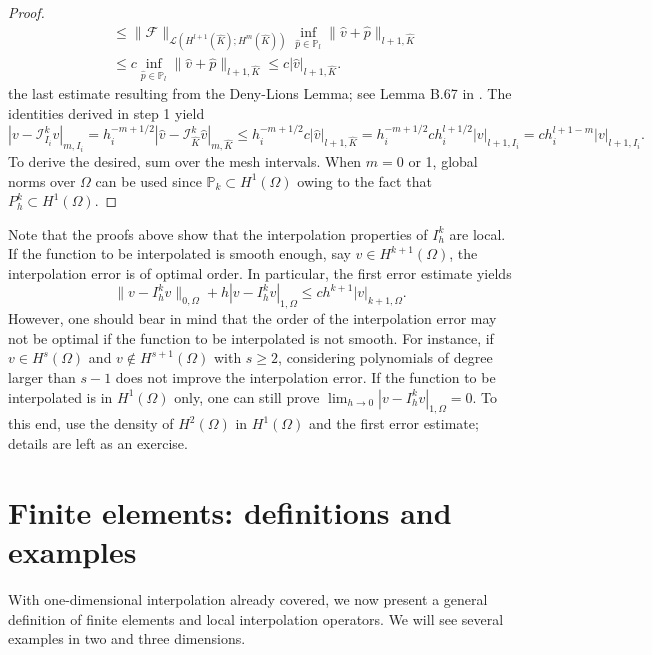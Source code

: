 \begin{lemma}
\begin{proof}
\begin{align*}
        &\le \|\mathcal{F}\|_{\mathcal{L}(H^{l+1}(\hat{K});H^m(\hat{K}))} \inf_{\hat{p} \in \mathbb{P}_l} \|\hat{v} + \hat{p}\|_{l+1,\hat{K}} \\
        &\le c \inf_{\hat{p} \in \mathbb{P}_l} \|\hat{v} + \hat{p}\|_{l+1,\hat{K}} \le c |\hat{v}|_{l+1,\hat{K}}.
    \end{align*}
    the last estimate resulting from the Deny-Lions Lemma; see Lemma B.67 in \cite{ern2004theory}. The identities derived in step 1 yield
    \begin{equation*}
|v - \mathcal{I}_{I_i}^k v|_{m,I_i} = h_i^{-m+1/2} |\hat{v} - \mathcal{I}_{\hat{K}}^k \hat{v}|_{m,\hat{K}} \le h_i^{-m+1/2} c |\hat{v}|_{l+1,\hat{K}} = h_i^{-m+1/2} c h_i^{l+1/2} |v|_{l+1,I_i} = c h_i^{l+1-m} |v|_{l+1,I_i}.
\end{equation*}
    To derive the desired, sum over the mesh intervals. When $m = 0$ or 1, global norms over $\Omega$ can be used since $\mathbb{P}_k \subset H^1(\Omega)$ owing to the fact that $P_h^k\subset H^1(\Omega)$.
\end{proof}
\end{lemma}
Note that the proofs above show that the interpolation properties of $I_h^k$ are local. If the function to be interpolated is smooth enough, say $v \in H^{k+1}(\Omega)$, the interpolation error is of optimal order. In particular, the first error estimate yields
\begin{equation*}
\|v - I_h^k v\|_{0,\Omega} + h |v - I_h^k v|_{1,\Omega} \le c h^{k+1} |v|_{k+1,\Omega}.
\end{equation*}
However, one should bear in mind that the order of the interpolation error may not be optimal if the function to be interpolated is not smooth. For instance, if $v \in H^s(\Omega)$ and $v \notin H^{s+1}(\Omega)$ with $s \ge 2$, considering polynomials of degree larger than $s-1$ does not improve the interpolation error. If the function to be interpolated is in $H^1(\Omega)$ only, one can still prove $\lim_{h \rightarrow 0} |v - I_h^k v|_{1,\Omega} = 0$. To this end, use the density of $H^2(\Omega)$ in $H^1(\Omega)$ and the first error estimate; details are left as an exercise.

\section{Finite elements: definitions and examples}
With one-dimensional interpolation already covered, we now present a general definition of finite elements and local interpolation operators. We will see several examples in two and three dimensions. 

